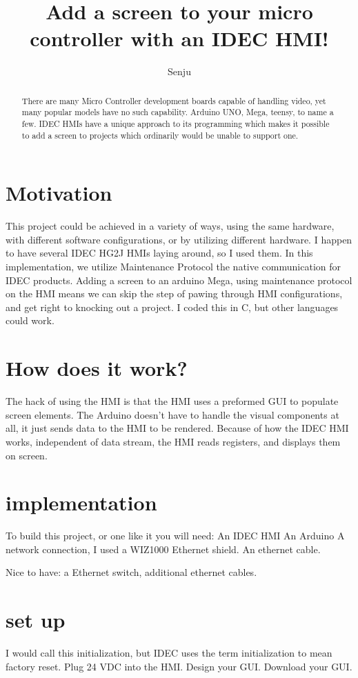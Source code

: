 \documentclass[]{article}
\title{Add a screen to your micro controller with an IDEC HMI!}
\author{Senju}
\begin{document}
	
	\maketitle
	
	\begin{abstract}
		There are many Micro Controller development boards capable of handling video, yet many popular models have no such capability. Arduino UNO, Mega, teensy, to name a few.
		IDEC HMIs have a unique approach to its programming which makes it possible to add a screen to projects which ordinarily would be unable to support one. 
	\end{abstract}
	\section*{Motivation} This project could be achieved in a variety of ways, using the same hardware, with different software configurations, or by utilizing different hardware. 
	I happen to have several IDEC HG2J HMIs laying around, so I used them. 
	In this implementation, we utilize Maintenance Protocol the native communication for IDEC products. Adding a screen to an arduino Mega, using maintenance protocol on the HMI means we 
	can skip the step of pawing through HMI configurations, and get right to knocking out a project.  I coded this in C, but other languages could work.  
	
	\section*{How does it work?}
	The hack of using the HMI is that the HMI uses a preformed GUI to populate screen elements. The Arduino doesn't have to handle the visual components at all, it just sends data to the HMI to be rendered.
	Because of how the IDEC HMI works, independent of data stream, the HMI reads registers, and displays them on screen. 
	\section*{implementation}
	To build this project, or one like it you will need:
	An IDEC HMI
	An Arduino
	A network connection, I used a WIZ1000 Ethernet shield.
	An ethernet cable. 
	
	Nice to have: a Ethernet switch, additional ethernet cables. 
	
	\section*{set up}
	I would call this initialization, but IDEC uses the term initialization to mean factory reset.
	Plug 24 VDC into the HMI.
	Design your GUI.
	Download your GUI.
	
\end{document}
